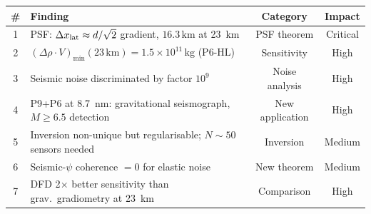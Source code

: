 \documentclass[aps,prd,twocolumn,superscriptaddress,nofootinbib]{revtex4-2}
\newcommand{\drho}{\Delta\rho}
\newcommand{\km}{\,\mathrm{km}}
\begin{document}
\begin{center}
\begin{tabular}{clcc}
\toprule
\# & Finding & Category & Impact \\
\midrule
1 & PSF: $\Delta x_{\rm lat} \approx d/\sqrt{2}$ gradient,
  $16.3\km$ at 23~km & PSF theorem & Critical \\
2 & $(\drho\cdot V)_{\min}(23\km) = 1.5\times10^{11}\,\mathrm{kg}$
  (P6-HL) & Sensitivity & High \\
3 & Seismic noise discriminated by factor $10^{9}$ & Noise analysis & High \\
4 & P9+P6 at 8.7~nm: gravitational seismograph,
  $M \geq 6.5$ detection & New application & High \\
5 & Inversion non-unique but regularisable; $N \sim 50$ sensors
  needed & Inversion & Medium \\
6 & Seismic-$\psi$ coherence $= 0$ for elastic noise & New theorem & Medium \\
7 & DFD 2$\times$ better sensitivity than grav.\ gradiometry at 23~km & Comparison & High \\
\bottomrule
\end{tabular}
\end{center}
\end{document}

